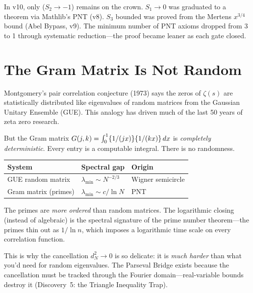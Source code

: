 \documentclass[11pt,a4paper]{article}
\begin{document}
\begin{observation}
In v10, only  ($S_2 \to -1$) remains on the crown.
$S_1 \to 0$ was graduated to a theorem via Mathlib's PNT (v8).
$S_3$ bounded was proved from the Mertens $x^{3/4}$ bound (Abel Bypass, v9).
The minimum number of PNT axioms dropped from 3 to 1 through systematic
reduction---the proof became leaner as each gate closed.
\end{observation}

\section{The Gram Matrix Is Not Random}
\label{sec:random}

Montgomery's pair correlation conjecture (1973) says the zeros of
$\zeta(s)$ are statistically distributed like eigenvalues of random
matrices from the Gaussian Unitary Ensemble (GUE). This analogy has
driven much of the last 50 years of zeta zero research.

But the Gram matrix $G(j,k) = \int_0^1 \{1/(jx)\}\{1/(kx)\}\,dx$
is \emph{completely deterministic}. Every entry is a computable integral.
There is no randomness.

\begin{observation}
\begin{center}
\begin{tabular}{@{}lll@{}}
\toprule
\textbf{System} & \textbf{Spectral gap} & \textbf{Origin} \\
\midrule
GUE random matrix & $\lambda_{\min} \sim N^{-2/3}$ & Wigner semicircle \\
Gram matrix (primes) & $\lambda_{\min} \sim c / \ln N$ & PNT \\
\bottomrule
\end{tabular}
\end{center}

The primes are \emph{more ordered} than random matrices. The
logarithmic closing (instead of algebraic) is the spectral signature
of the prime number theorem---the primes thin out as $1/\ln n$,
which imposes a logarithmic time scale on every correlation function.
\end{observation}

This is why the cancellation $d_N^2 \to 0$ is so delicate: it is
\emph{much harder} than what you'd need for random eigenvalues.
The Parseval Bridge exists because the cancellation must be tracked
through the Fourier domain---real-variable bounds destroy it
(Discovery~5: the Triangle Inequality Trap).
\end{document}
